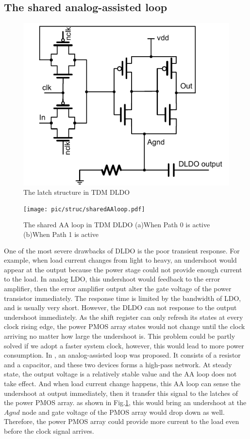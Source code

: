 \documentclass[journal]{IEEEtran}
\begin{document}
\subsection{The shared analog-assisted loop}
\begin{figure}[t!]
    \centering
    \includegraphics[width=\linewidth]{pic/struc/latch.pdf}
    \caption{The latch structure in TDM DLDO}
    \label{fig:lat}
\end{figure}
\begin{figure}[t!]
    \centering
    \texttt{[image: pic/struc/sharedAAloop.pdf]}
    \caption{The shared AA loop in TDM DLDO (a)When Path 0 is active (b)When Path 1 is active}
    \label{fig:sharedAAloop}
\end{figure}
One of the most severe drawbacks of DLDO is the poor transient response. For example, when load current changes from light to heavy, an undershoot would appear at the output because the power stage could not provide enough current to the load. In analog LDO, this undershoot would feedback to the error amplifier, then the error amplifier output alter the gate voltage of the power transistor immediately. The response time is limited by the bandwidth of LDO, and is usually very short. However, the DLDO can not response to the output undershoot immediately. As the shift register can only refresh its states at every clock rising edge, the power PMOS array states would not change until the clock arriving no matter how large the undershoot is. This problem could be partly solved if we adopt a faster system clock, however, this would lead to more power consumption. In \cite{AALDO,AALDO1,NANDbasedAAloop}, an analog-assisted loop was proposed. It consists of a resistor and a capacitor, and these two devices forms a high-pass network. At steady state, the output voltage is a relatively stable value and the AA loop does not take effect. And when load current change happens, this AA loop can sense the undershoot at output immediately, then it transfer this signal to the latches of the power PMOS array. as shown in Fig.\ref{fig:lat}, this would bring an undershoot at the $Agnd$ node and gate voltage of the PMOS array would drop down as well.  Therefore, the power PMOS array could provide more current to the load even before the clock signal arrives.
\end{document}

